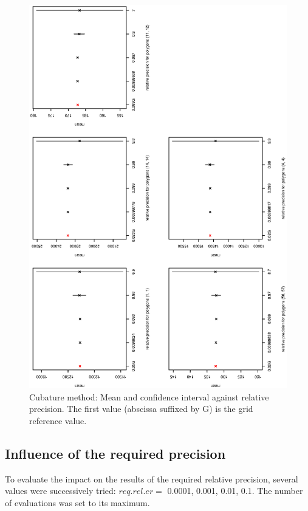 \begin{figure}
\begin{center}
      \includegraphics[angle=-90,width=15cm]{./VignetteDir/graphics/chapExample/ICreler.eps}
\caption{Cubature method: Mean and confidence interval against 
  relative precision. The first value (abscissa suffixed by G) is the grid reference value.}\label{fig:ICreler}
    \end{center}
  \end{figure}

  \hfill

\subsection{Influence of the required precision}

To evaluate the impact on the results of the required
relative precision, several values
were successively tried:
$req.rel.er =$ 0.0001, 0.001, 0.01, 0.1.
The number of evaluations was set to its maximum.



